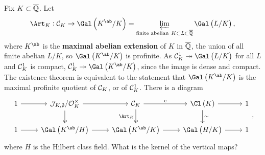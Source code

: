 Fix $ K \subset \overline{\mathbb{Q}} $. Let
$$ \Art_K : \CCC_K \to \Gal\br{K^{\ab} / K} = \varprojlim_{\text{finite abelian} \ K \subset L \subset \overline{\QQ}} \Gal\br{L / K}, $$
where $ K^{\ab} $ is the \textbf{maximal abelian extension} of $ K $ in $ \overline{\mathbb{Q}} $, the union of all finite abelian $ L / K $, so $ \Gal\br{K^{\ab} / K} $ is profinite. As $ \CCC_K^1 \twoheadrightarrow \Gal\br{L / K} $ for all $ L $ and $ \mathcal{C}_K^1 $ is compact, $ \CCC_K^1 \twoheadrightarrow \Gal\br{K^{\ab} / K} $, since the image is dense and compact. The existence theorem is equivalent to the statement that $ \Gal\br{K^{\ab} / K} $ is the maximal profinite quotient of $ \mathcal{C}_K $, or of $ \mathcal{C}_K^1 $. There is a diagram
$$
\begin{tikzcd}
1 \arrow{r} & \JJJ_{K, \emptyset} / \OOO_K^\times \arrow{r} \arrow[twoheadrightarrow]{d} & \CCC_K \arrow{r}{\c} \arrow[twoheadrightarrow]{d}[swap]{\Art_K} & \Cl\br{K} \arrow{r} \arrow{d}{\sim} & 1 \\
1 \arrow{r} & \Gal\br{K^{\ab} / H} \arrow{r} & \Gal\br{K^{\ab} / K} \arrow{r} & \Gal\br{H / K} \arrow{r} & 1
\end{tikzcd},
$$
where $ H $ is the Hilbert class field. What is the kernel of the vertical maps?
